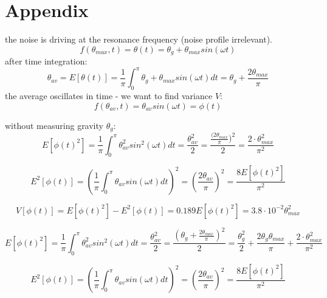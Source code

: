 \documentclass[\main/master.tex]{subfiles}
\begin{document}
\newspacing
\chapter{Appendix}\label{chapter:Appendix}
\iffalse
the noise is driving at the resonance frequency (noise profile irrelevant). 
\begin{equation}
f(\theta_{max},t) = \theta(t)  = \theta_g+\theta_{max} sin(\omega t)
\label{eqn:rms}
\end{equation}
after time integration:
\begin{equation}
\theta_{av}=E[\theta(t)]=\frac{1}{\pi}\int_0^{\pi}\theta_g+\theta_{max} sin(\omega t) dt=\theta_g+\frac{2 \theta_{max}}{\pi}  
\label{eqn:av}
\end{equation}
the average oscillates in time - we want to find variance $V$:
\begin{equation}
f(\theta_{av},t) =  \theta_{av} sin(\omega t) =\phi(t)
\label{eqn:rms}
\end{equation}

without measuring gravity $\theta_g$:
\begin{equation}
E[\phi(t)^2]=\frac{1}{\pi}\int_0^{\pi}\theta_{av}^2 sin^2(\omega t) dt = \frac{\theta_{av}^2}{2} =  \frac{\frac{(2 \theta_{max}}{\pi})^2}{2} = \frac{2\cdot \theta_{max}^2}{\pi^2} 
\label{eqn:av}
\end{equation}

\begin{equation}
E^2[\phi(t)]=(\frac{1}{\pi}\int_0^{\pi}\theta_{av} sin(\omega t) dt)^2 =(\frac{2 \theta_{av}}{\pi})^2  = \frac{8 E[\phi(t)^2]}{\pi^2}
\label{eqn:av}
\end{equation}


\begin{equation}
V[\phi(t)] = E[\phi(t)^2] - E^2[\phi(t)] = 0.189E [\phi(t)^2] = 3.8\cdot 10^{-2} \theta_{max}^2
\end{equation}



\begin{equation}
E[\phi(t)^2]=\frac{1}{\pi}\int_0^{\pi}\theta_{av}^2 sin^2(\omega t) dt = \frac{\theta_{av}^2}{2} =  \frac{(\theta_g+\frac{2 \theta_{max}}{\pi} )^2}{2} = \frac{\theta_g^2}{2} +\frac{2 \theta_g\theta_{max}}{\pi}+\frac{2\cdot \theta_{max}^2}{\pi^2} 
\label{eqn:av}
\end{equation}

\begin{equation}
E^2[\phi(t)]=(\frac{1}{\pi}\int_0^{\pi}\theta_{av} sin(\omega t) dt)^2 =(\frac{2 \theta_{av}}{\pi})^2  = \frac{8 E[\phi(t)^2]}{\pi^2}
\label{eqn:av}
\end{equation}
\end{document}
